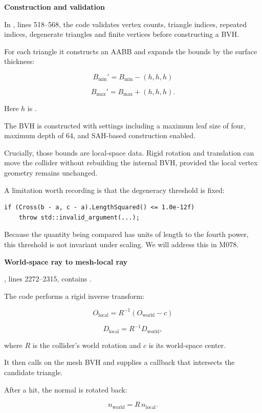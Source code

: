 \textbf{Construction and validation}

In , lines 518--568, the code validates vertex counts, triangle indices, repeated indices, degenerate triangles and finite vertices before constructing a BVH.

For each triangle it constructs an AABB and expands the bounds by the surface thickness:

\[
B_{\min}'=B_{\min}-(h,h,h)
\]

\[
B_{\max}'=B_{\max}+(h,h,h).
\]

Here \(h\) is .

The BVH is constructed with settings including a maximum leaf size of four, maximum depth of 64, and SAH-based construction enabled.

Crucially, those bounds are local-space data. Rigid rotation and translation can move the collider without rebuilding the internal BVH, provided the local vertex geometry remains unchanged.

A limitation worth recording is that the degeneracy threshold is fixed:

\begin{verbatim}
if (Cross(b - a, c - a).LengthSquared() <= 1.0e-12f)
    throw std::invalid_argument(...);
\end{verbatim}

Because the quantity being compared has units of length to the fourth power, this threshold is not invariant under scaling. We will address this in M078.

\textbf{World-space ray to mesh-local ray}

, lines 2272--2315, contains .

The code performs a rigid inverse transform:

\[
O_{\text{local}}=R^{-1}(O_{\text{world}}-c)
\]

\[
D_{\text{local}}=R^{-1}D_{\text{world}},
\]

where \(R\) is the collider's world rotation and \(c\) is its world-space center.

It then calls  on the mesh BVH and supplies a callback that intersects the candidate triangle.

After a hit, the normal is rotated back:

\[
n_{\text{world}}=R\,n_{\text{local}}.
\]

